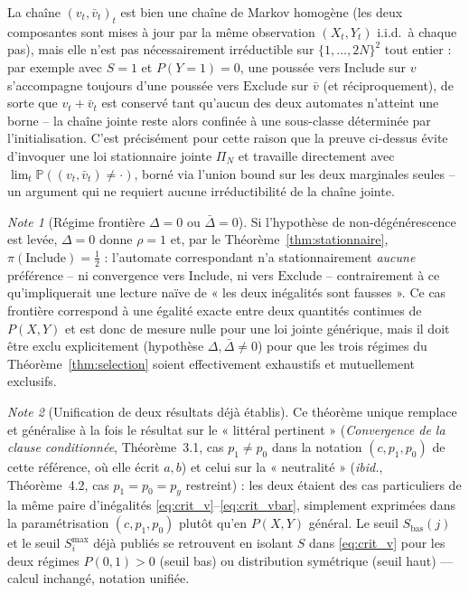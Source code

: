 \documentclass[12pt,a4paper]{article}
\theoremstyle{remark}
\newtheorem{note}{Note}[section]
\newcommand{\Inc}{\ensuremath{\mathrm{Include}}}
\newcommand{\Exc}{\ensuremath{\mathrm{Exclude}}}
\newcommand{\vbar}{\bar{v}}
\begin{document}
\begin{remark}
La chaîne $(v_t,\vbar_t)_t$ est bien une chaîne de Markov homogène (les deux
composantes sont mises à jour par la même observation $(X_t,Y_t)$ i.i.d.\ à
chaque pas), mais elle n'est pas nécessairement irréductible sur
$\{1,\ldots,2N\}^2$ tout entier : par exemple avec $S=1$ et $P(Y{=}1)=0$, une
poussée vers $\Inc$ sur $v$ s'accompagne toujours d'une poussée vers $\Exc$ sur
$\vbar$ (et réciproquement), de sorte que $v_t+\vbar_t$ est conservé tant
qu'aucun des deux automates n'atteint une borne -- la chaîne jointe reste alors
confinée à une sous-classe déterminée par l'initialisation. C'est précisément
pour cette raison que la preuve ci-dessus évite d'invoquer une loi stationnaire
jointe $\Pi_N$ et travaille directement avec $\lim_t \mathbb
P((v_t,\vbar_t)\ne\cdot)$, borné via l'union bound sur les deux marginales
seules -- un argument qui ne requiert aucune irréductibilité de la chaîne
jointe.
\end{remark}

\begin{note}[Régime frontière $\Delta=0$ ou $\bar\Delta=0$]
Si l'hypothèse de non-dégénérescence est levée, $\Delta=0$ donne $\rho=1$ et,
par le Théorème~\ref{thm:stationnaire}, $\pi(\Inc)=\tfrac12$ : l'automate
correspondant n'a stationnairement \emph{aucune} préférence -- ni convergence
vers $\Inc$, ni vers $\Exc$ -- contrairement à ce qu'impliquerait une lecture
naïve de « les deux inégalités sont fausses ». Ce cas frontière correspond à
une égalité exacte entre deux quantités continues de $P(X,Y)$ et est donc de
mesure nulle pour une loi jointe générique, mais il doit être exclu
explicitement (hypothèse $\Delta,\bar\Delta\ne0$) pour que les trois régimes du
Théorème~\ref{thm:selection} soient effectivement exhaustifs et mutuellement
exclusifs.
\end{note}

\begin{note}[Unification de deux résultats déjà établis]
Ce théorème unique remplace et généralise à la fois le résultat sur le
« littéral pertinent » (\textit{Convergence de la clause conditionnée},
Théorème~3.1, cas $p_1\ne p_0$ dans la notation $(c,p_1,p_0)$ de cette
référence, où elle écrit $a,b$) et celui sur la « neutralité » (\emph{ibid.},
Théorème~4.2, cas $p_1{=}p_0{=}p_y$ restreint) : les deux étaient des cas
particuliers de la même paire d'inégalités \eqref{eq:crit_v}--\eqref{eq:crit_vbar},
simplement exprimées dans la paramétrisation $(c,p_1,p_0)$ plutôt qu'en
$P(X,Y)$ général. Le seuil $S_{\text{bas}}(j)$ et le seuil $S_i^{\max}$ déjà publiés se
retrouvent en isolant $S$ dans \eqref{eq:crit_v} pour les deux régimes
$P(0,1)>0$ (seuil bas) ou distribution symétrique (seuil haut) --- calcul
inchangé, notation unifiée.
\end{note}
\end{document}
